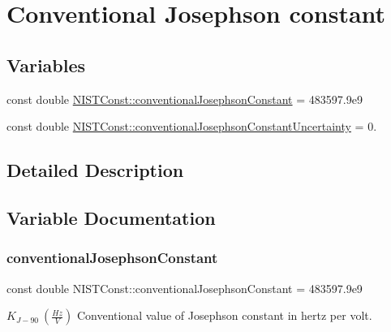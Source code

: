 \hypertarget{group___n_i_s_t_const-_conventional_josephson_constant}{}\section{Conventional Josephson constant}
\label{group___n_i_s_t_const-_conventional_josephson_constant}
\subsection*{Variables}
\begin{DoxyCompactItemize}
\item 
const double \hyperlink{group___n_i_s_t_const-_conventional_josephson_constant_gaebced2333dcb300798ec2d2c128db9b9}{N\+I\+S\+T\+Const\+::conventional\+Josephson\+Constant} = 483597.\+9e9
\item 
const double \hyperlink{group___n_i_s_t_const-_conventional_josephson_constant_ga0a76d60ad55268297c99761c7492220f}{N\+I\+S\+T\+Const\+::conventional\+Josephson\+Constant\+Uncertainty} = 0.
\end{DoxyCompactItemize}


\subsection{Detailed Description}


\subsection{Variable Documentation}
\mbox{\label{group___n_i_s_t_const-_conventional_josephson_constant_gaebced2333dcb300798ec2d2c128db9b9}} 
\subsubsection{\texorpdfstring{conventional\+Josephson\+Constant}{conventionalJosephsonConstant}}
{\footnotesize\ttfamily const double N\+I\+S\+T\+Const\+::conventional\+Josephson\+Constant = 483597.\+9e9}

$K_{J-90} \ (\frac{Hz}{V})$ Conventional value of Josephson constant in hertz per volt. \mbox{\label{group___n_i_s_t_const-_conventional_josephson_constant_ga0a76d60ad55268297c99761c7492220f}} 
